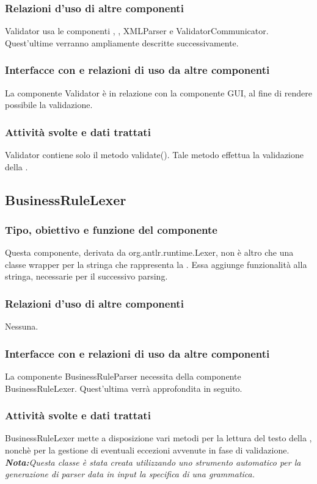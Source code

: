 \documentclass[11pt,titlepage,a4paper]{report}
\begin{document}
\subsubsection{Relazioni d'uso di altre componenti}
Validator usa le componenti \brp, \brl, XMLParser e ValidatorCommunicator. Quest'ultime verranno ampliamente descritte successivamente.
\subsubsection{Interfacce con e relazioni di uso da altre componenti}
La componente Validator \`e in relazione con la componente GUI, al fine di rendere possibile la validazione.
\subsubsection{Attivit\`a svolte e dati trattati}
Validator contiene solo il metodo validate(). Tale metodo effettua la validazione della \br.

\subsection{BusinessRuleLexer}
\subsubsection{Tipo, obiettivo e funzione del componente}
Questa componente, derivata da org.antlr.runtime.Lexer, non \`e altro che una classe wrapper per la stringa che rappresenta la \br. Essa aggiunge funzionalit\`a alla stringa, necessarie per il successivo parsing.
\subsubsection{Relazioni d'uso di altre componenti}
Nessuna.
\subsubsection{Interfacce con e relazioni di uso da altre componenti}
La componente BusinessRuleParser necessita della componente BusinessRuleLexer. Quest'ultima verr\`a approfondita in seguito.
\subsubsection{Attivit\`a svolte e dati trattati}
BusinessRuleLexer mette a disposizione vari metodi per la lettura del testo della \br, nonch\`e per la gestione di eventuali eccezioni avvenute in fase di validazione.\\
\textit{\textbf{Nota:}Questa classe \`e stata creata utilizzando uno strumento automatico per la generazione di parser data in input la specifica di una grammatica.}
\end{document}
